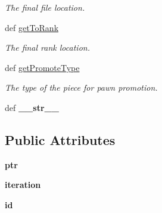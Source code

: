 \begin{DoxyCompactItemize}
\begin{DoxyCompactList}\small\item\em The final file location. \item\end{DoxyCompactList}\item 
\hypertarget{classGameObject_1_1Move_ab4274abab85fdc4567d5e454ec920849}{
def \hyperlink{classGameObject_1_1Move_ab4274abab85fdc4567d5e454ec920849}{getToRank}}
\label{classGameObject_1_1Move_ab4274abab85fdc4567d5e454ec920849}

\begin{DoxyCompactList}\small\item\em The final rank location. \item\end{DoxyCompactList}\item 
def \hyperlink{classGameObject_1_1Move_a615ace235019328089cca1a1f8674955}{getPromoteType}
\begin{DoxyCompactList}\small\item\em The type of the piece for pawn promotion. \item\end{DoxyCompactList}\item 
\hypertarget{classGameObject_1_1Move_a23d509a282101220907d2438918be680}{
def {\bfseries \_\-\_\-str\_\-\_\-}}
\label{classGameObject_1_1Move_a23d509a282101220907d2438918be680}

\end{DoxyCompactItemize}
\subsection*{Public Attributes}
\begin{DoxyCompactItemize}
\item 
\hypertarget{classGameObject_1_1Move_a6d3e5a3f5e8875c18bce3cd43e5e8c7f}{
{\bfseries ptr}}
\label{classGameObject_1_1Move_a6d3e5a3f5e8875c18bce3cd43e5e8c7f}

\item 
\hypertarget{classGameObject_1_1Move_a516e4b67ebe588c76b955221d3fc1659}{
{\bfseries iteration}}
\label{classGameObject_1_1Move_a516e4b67ebe588c76b955221d3fc1659}

\item 
\hypertarget{classGameObject_1_1Move_ad61e6afdc612d8005a6117ce4061efad}{
{\bfseries id}}
\label{classGameObject_1_1Move_ad61e6afdc612d8005a6117ce4061efad}

\end{DoxyCompactItemize}


